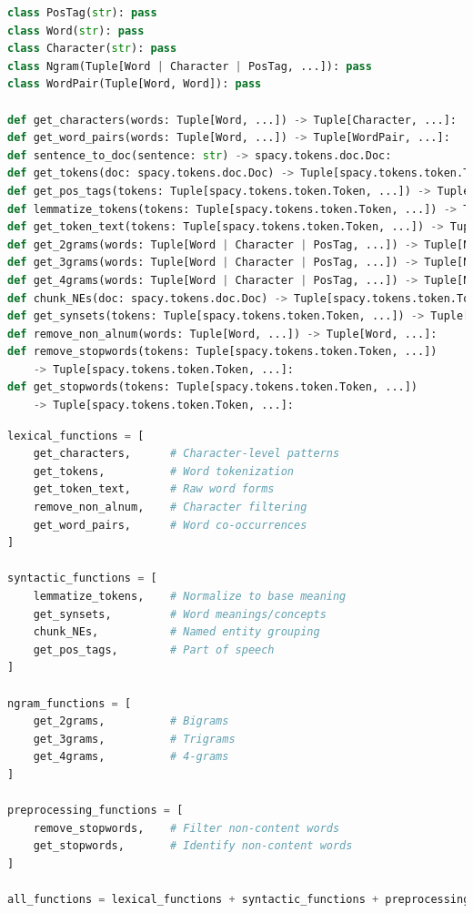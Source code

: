\documentclass{beamer}
\begin{document}
\begin{frame}[fragile]{}
    \begin{lstlisting}[language=Python]
class PosTag(str): pass
class Word(str): pass
class Character(str): pass
class Ngram(Tuple[Word | Character | PosTag, ...]): pass
class WordPair(Tuple[Word, Word]): pass

def get_characters(words: Tuple[Word, ...]) -> Tuple[Character, ...]:
def get_word_pairs(words: Tuple[Word, ...]) -> Tuple[WordPair, ...]:
def sentence_to_doc(sentence: str) -> spacy.tokens.doc.Doc:
def get_tokens(doc: spacy.tokens.doc.Doc) -> Tuple[spacy.tokens.token.Token, ...]:
def get_pos_tags(tokens: Tuple[spacy.tokens.token.Token, ...]) -> Tuple[PosTag, ...]:
def lemmatize_tokens(tokens: Tuple[spacy.tokens.token.Token, ...]) -> Tuple[Word, ...]:
def get_token_text(tokens: Tuple[spacy.tokens.token.Token, ...]) -> Tuple[Word, ...]:
def get_2grams(words: Tuple[Word | Character | PosTag, ...]) -> Tuple[Ngram, ...]:
def get_3grams(words: Tuple[Word | Character | PosTag, ...]) -> Tuple[Ngram, ...]:
def get_4grams(words: Tuple[Word | Character | PosTag, ...]) -> Tuple[Ngram, ...]:
def chunk_NEs(doc: spacy.tokens.doc.Doc) -> Tuple[spacy.tokens.token.Token, ...]:
def get_synsets(tokens: Tuple[spacy.tokens.token.Token, ...]) -> Tuple[Word, ...]:
def remove_non_alnum(words: Tuple[Word, ...]) -> Tuple[Word, ...]:
def remove_stopwords(tokens: Tuple[spacy.tokens.token.Token, ...])
    -> Tuple[spacy.tokens.token.Token, ...]:
def get_stopwords(tokens: Tuple[spacy.tokens.token.Token, ...])
    -> Tuple[spacy.tokens.token.Token, ...]:
    \end{lstlisting}
\end{frame}

\begin{frame}[fragile]{}
    \begin{lstlisting}[language=Python]
lexical_functions = [
    get_characters,      # Character-level patterns
    get_tokens,          # Word tokenization
    get_token_text,      # Raw word forms
    remove_non_alnum,    # Character filtering
    get_word_pairs,      # Word co-occurrences
]

syntactic_functions = [
    lemmatize_tokens,    # Normalize to base meaning
    get_synsets,         # Word meanings/concepts
    chunk_NEs,           # Named entity grouping
    get_pos_tags,        # Part of speech
]

ngram_functions = [
    get_2grams,          # Bigrams
    get_3grams,          # Trigrams
    get_4grams,          # 4-grams
]

preprocessing_functions = [
    remove_stopwords,    # Filter non-content words
    get_stopwords,       # Identify non-content words
]

all_functions = lexical_functions + syntactic_functions + preprocessing_functions
    \end{lstlisting}
\end{frame}
\end{document}
